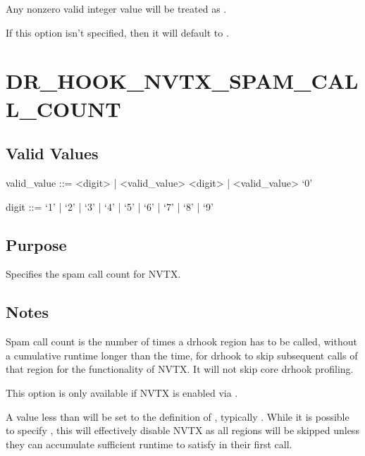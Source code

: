 \documentclass[letterpaper,10pt,english]{sphinxmanual}
\begin{document}
\sphinxAtStartPar
Any non\sphinxhyphen{}zero valid integer value will be treated as .

\sphinxAtStartPar
If this option isn’t specified, then it will default to .


\section{DR\_HOOK\_NVTX\_SPAM\_CALL\_COUNT}
\label{\detokenize{flag/flag:dr-hook-nvtx-spam-call-count}}\label{\detokenize{flag/flag:id234}}

\subsection{Valid Values}
\label{\detokenize{flag/flag:id235}}
\begin{DUlineblock}{0em}
\item[] valid\_value ::= \textless{}digit\textgreater{} | \textless{}valid\_value\textgreater{} \textless{}digit\textgreater{} | \textless{}valid\_value\textgreater{} ‘0’
\item[] digit ::= ‘1’ | ‘2’ | ‘3’ | ‘4’ | ‘5’ | ‘6’ | ‘7’ | ‘8’ | ‘9’
\end{DUlineblock}


\subsection{Purpose}
\label{\detokenize{flag/flag:id236}}
\sphinxAtStartPar
Specifies the spam call count for NVTX.


\subsection{Notes}
\label{\detokenize{flag/flag:id237}}
\sphinxAtStartPar
Spam call count is the number of times a drhook region has to be called, without a cumulative runtime longer than the {\hyperref[\detokenize{flag/flag:dr-hook-nvtx-spam-wt}]{}} time, for drhook to skip subsequent calls of that region for the functionality of NVTX. It will not skip core drhook profiling.

\sphinxAtStartPar
This option is only available if NVTX is enabled via {\hyperref[\detokenize{flag/flag:dr-hook-nvtx}]{}}.

\sphinxAtStartPar
A value less than  will be set to the definition of , typically . While it is possible to specify , this will effectively disable NVTX as all regions will be skipped \sphinxhyphen{} unless they can accumulate sufficient runtime to satisfy {\hyperref[\detokenize{flag/flag:dr-hook-nvtx-spam-wt}]{}} in their first call.
\end{document}
